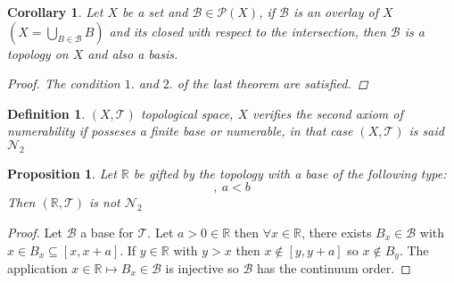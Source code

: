 \documentclass{article}
\newtheorem{proposition}{Proposition}
\newtheorem{definition}{Definition}
\newtheorem{corollary}{Corollary}
\begin{document}
    \begin{corollary}
        Let $X$ be a set and $\mathcal{B} \in \mathcal{P}(X)$, if $\mathcal{B}$ is an overlay of $X$ \\ $(X = \bigcup_{B \in \mathcal{B}}B)$ and its closed with respect to the intersection, then $\mathcal{B}$ is a topology on $X$ and also a basis.
        \begin{proof}
            The condition $1.$ and $2.$ of the last theorem are satisfied.
        \end{proof}
    \end{corollary}
    \newpage
    \begin{definition}
        $(X, \mathcal{T})$ topological space, $X$ verifies the second axiom of numerability if posseses a finite base or numerable, in that case $(X, \mathcal{T})$ is said $\mathcal{N}_2$
    \end{definition}
    \begin{proposition}
        Let $\mathbb{R}$ be gifted by the topology with a base of the following type: 
        \begin{equation*}
            [a,b], \ a < b    
        \end{equation*}
        Then $(\mathbb{R}, \mathcal{T})$ is not $\mathcal{N}_2$
    \end{proposition}
    \begin{proof}
        Let $\mathcal{B}$ a base for $\mathcal{T}$. Let $a > 0 \in \mathbb{R}$ then $\forall x  \in \mathbb{R}$, there exists $B_x \in \mathcal{B}$ with $x \in B_x \subseteq [x, x + a]$.
        If $y \in \mathbb{R}$ with $y > x$ then $x \notin [y, y + a]$ so $x \notin B_y$.
        The application $x\in \mathbb{R} \longmapsto B_x \in \mathcal{B}$  is injective so $ \mathcal{B}$ has the continuum order.    
    \end{proof}
\end{document}

